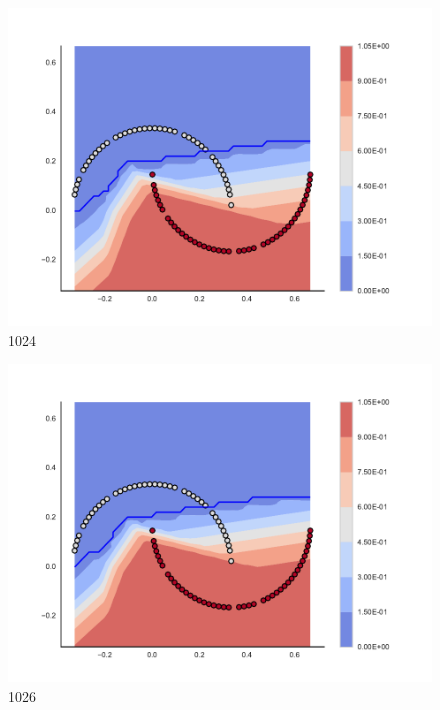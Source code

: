 \begin{subfigure}[b]{0.09\textwidth}
    \includegraphics[clip, trim=2.35cm 1.75cm 4.5cm 0cm,width=\textwidth]{img/convergence/1024.pdf}
    \caption{1024}
    \label{fig:convergence_1024}
\end{subfigure}
%
\begin{subfigure}[b]{0.09\textwidth}
    \includegraphics[clip, trim=2.35cm 1.75cm 4.5cm 0cm,width=\textwidth]{img/convergence/1026.pdf}
    \caption{1026}
    \label{fig:convergence_1026}
\end{subfigure}
%
